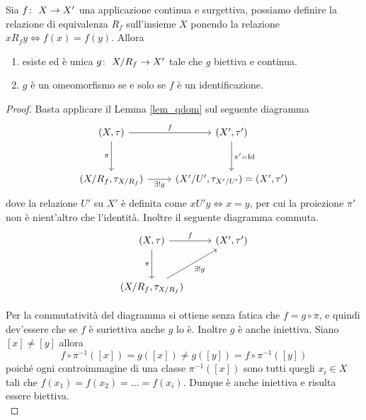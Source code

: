 \begin{theorem}
	Sia  $f \colon\ X \rightarrow X'$ una applicazione continua e surgettiva, possiamo definire la relazione di equivalenza $R_f$ sull'insieme $X$ ponendo la relazione $xR_fy \Leftrightarrow f(x) = f(y)$. Allora 
	\begin{enumerate}
		\item esiste ed è unica $g \colon\ X/R_f \rightarrow X'$ tale che $g$ biettiva e continua.
		\item $g$ è un omeomorfismo se e solo se $f$ è un identificazione.
	\end{enumerate}
\end{theorem}
\begin{proof}
	Basta applicare il Lemma \ref{lem_qdom} sul seguente diagramma
	\begin{equation*}
	\begin{tikzcd}[row sep = 3em]
		(X, \tau) \arrow[swap]{d}{\pi} \arrow{r}{f} & (X', \tau') \arrow{d}{\pi' = \operatorname{Id}}\\
		(X/R_f, \tau_{X/R_f}) \arrow[swap]{r}{\exists! g} & (X'/U', \tau_{X'/U'}) = (X', \tau')
	\end{tikzcd}	
	\end{equation*}
	dove la relazione $U'$ su $X'$ è definita come $xU'y \Leftrightarrow x = y$, per cui la proiezione $\pi'$ non è nient'altro che l'identità. Inoltre il seguente diagramma commuta. 
	\begin{equation*}
	\begin{tikzcd}[row sep = 3em]
		(X, \tau) \arrow[swap]{d}{\pi} \arrow{r}{f} & (X', \tau') \\
		(X/R_f, \tau_{X/R_f}) \arrow[swap]{ru}{\exists! g} &
	\end{tikzcd}	
	\end{equation*}
	
	Per la commutatività del diagramma si ottiene senza fatica che $f = g \circ \pi$, e quindi dev'essere che se $f$ è suriettiva anche $g$ lo è. Inoltre $g$ è anche iniettiva. Siano $\left[x\right] \neq \left[y\right]$ allora 
	\begin{equation*}
		f \circ \pi^{-1} (\left[x\right]) = g(\left[x\right]) \neq g(\left[y\right]) = f \circ \pi^{-1}(\left[y\right])
	\end{equation*}	
	poiché ogni controimmagine di una classe $\pi^{-1}(\left[x\right])$ sono tutti quegli $x_i \in X$ tali che $f(x_1) = f(x_2) = \dots = f(x_i)$. Dunque è anche iniettiva e risulta essere biettiva.\\
	

\end{proof}
